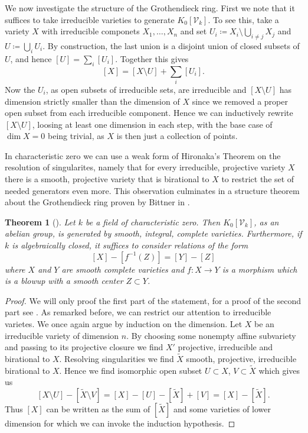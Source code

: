 \documentclass[11pt, a4paper, german]{article}
\theoremstyle{plain}
\newtheorem{theorem}{Theorem}[section]
\theoremstyle{definition}
\newcommand{\gring}[1][k]{K_0[\mathcal{V}_#1]}
\begin{document}

We now investigate the structure of the Grothendieck ring. First we note that it suffices to take irreducible varieties to generate $\gring[k]$.
To see this, take a variety $X$ with irreducible componets $X_1, \dots, X_n$ and set ${U_i \coloneqq X_i \setminus \bigcup_{i \neq j} X_j}$ and
$U \coloneqq \bigcup_i U_i$. By construction, the last union is a disjoint union of closed subsets of $U$, 
and hence $[U] = \sum_i [U_i]$. Together this gives
\[
    [X] = [X \setminus U] + \sum_i [U_i].
\] Now the $U_i$, as open subsets of irreducible sets, are irreducible and $[X \setminus U]$ has dimension
strictly smaller than the dimension of $X$ since we removed a proper open subset from each irreducible component. Hence we can inductively
rewrite $[X \setminus U]$, loosing at least one dimension in each step, with the base case of $\dim  X = 0$ being trivial, as $X$ is then
just a collection of points.

In characteristic zero we can use a weak form of Hironaka's Theorem on the resolution of singularites, namely that for every irreducible, 
projective variety $X$ there is a smooth, projective variety that is birational to $X$ to restrict the set of needed generators even more. 
This observation culminates in a structure theorem about the Grothendieck ring proven by Bittner in \cite{Bittner}.


\begin{theorem}[{\cite[Thm. 3.1]{Bittner}}]
    \label{bittner}
    Let $k$ be a field of characteristic zero. Then $\gring[k]$, as an abelian group, is generated by smooth, integral, complete varieties.
    Furthermore, if $k$ is algebraically closed, it suffices to consider relations of the form
    \[
        [X] - [f^{-1}(Z)] = [Y] - [Z]
    \]
    where $X$ and $Y$ are smooth complete varieties and $f \colon X \to Y$ is a morphism which is a blowup with a smooth center $Z \subset Y$. 
\end{theorem}
\begin{proof}
    We will only proof the first part of the statement, for a proof of the second part see \cite{Bittner}. As remarked before, we can restrict our
    attention to irreducible varietes.  We once again argue by induction on the dimension.
    Let $X$ be an irreducible variety of dimension $n$. By choosing some nonempty affine subvariety and passing to its projective closure we
    find $X'$ projective, irreducible and birational to $X$. Resolving singularities we find $\widetilde{X}$ smooth, projective, irreducible
    birational to $X$. Hence we find isomorphic open subset $U \subset X$, $V \subset \widetilde{X}$ which gives us
    \[
        [X \setminus U ] - [\widetilde{X} \setminus V] = [X] - [U] - [\widetilde{X}] + [V] = [X] - [\widetilde{X}].
    \]
    Thus $[X]$ can be written as the sum of $[\widetilde{X}]$ and some varieties of lower dimension for which we can invoke the induction
    hypothesis.
\end{proof}
\end{document}
